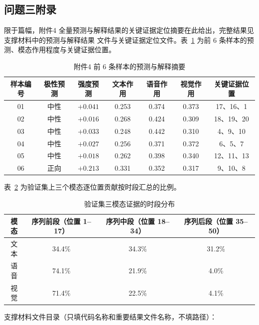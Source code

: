 \documentclass[bwprint]{gmcmthesis}
\begin{document}
\begin{appendices}
\section{问题三附录}

限于篇幅，附件4 全量预测与解释结果的关键证据定位摘要在此给出，完整结果见支撑材料中的预测与解释结果
文件与关键证据定位文件。表~\ref{tab:app_a4} 为前 6 条样本的预测、模态作用程度与关键证据位置。

\begin{table}[htp!]
\centering
\caption{附件4 前 6 条样本的预测与解释摘要}
\label{tab:app_a4}
\renewcommand\arraystretch{1.15}
\footnotesize
\setlength{\tabcolsep}{3pt}
\begin{tabular}{|c|c|c|c|c|c|c|}
\hline
样本编号 & 极性预测 & 强度预测 & 文本作用 & 语音作用 & 视觉作用 & 关键证据位置 \\
\hline
01 & 中性 & $+0.041$ & 0.253 & 0.374 & 0.373 & 17、16、1 \\
\hline
02 & 中性 & $+0.016$ & 0.268 & 0.424 & 0.309 & 18、19、20 \\
\hline
03 & 中性 & $+0.033$ & 0.248 & 0.442 & 0.310 & 4、9、10 \\
\hline
04 & 中性 & $+0.027$ & 0.256 & 0.371 & 0.372 & 6、5、7 \\
\hline
05 & 中性 & $+0.018$ & 0.262 & 0.398 & 0.340 & 12、11、13 \\
\hline
06 & 正向 & $+0.213$ & 0.331 & 0.352 & 0.317 & 9、10、8 \\
\hline
\end{tabular}
\end{table}

表~\ref{tab:app_seg} 为验证集上三个模态逐位置贡献按时段汇总的比例。

\begin{table}[htp!]
\centering
\caption{验证集三模态证据的时段分布}
\label{tab:app_seg}
\renewcommand\arraystretch{1.2}
\begin{tabular}{|c|c|c|c|}
\hline
模态 & 序列前段（位置 1--17） & 序列中段（位置 18--34） & 序列后段（位置 35--50） \\
\hline
文本 & 34.4\% & 34.3\% & 31.2\% \\
\hline
语音 & 74.1\% & 21.9\% & 4.0\% \\
\hline
视觉 & 71.4\% & 22.5\% & 4.1\% \\
\hline
\end{tabular}
\end{table}

\par\noindent\hspace{2em}支撑材料文件目录（只填代码名称和重要结果文件名称，不填路径）：\par


\end{appendices}
\end{document}
